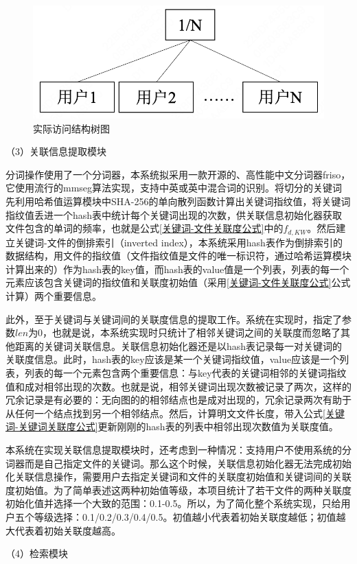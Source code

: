 \documentclass[promaster]{thesis-uestc}
\begin{document}
\begin{figure}[htbp]
    \centering
    \includegraphics[width = 0.5\linewidth]{pic/访问结构树.png}
    \caption{实际访问结构树图}
    \label{实际访问结构树图}
\end{figure}

（3）关联信息提取模块

分词操作使用了一个分词器，本系统拟采用一款开源的、高性能中文分词器friso，它使用流行的mmseg算法实现，支持中英或英中混合词的识别。将切分的关键词先利用哈希值运算模块中SHA-256的单向散列函数计算出关键词指纹值，将关键词指纹值丢进一个hash表中统计每个关键词出现的次数，供关联信息初始化器获取文件包含的单词的频率，也就是公式\ref{关键词-文件关联度公式}中的$f_{d, KW}$。然后建立关键词-文件的倒排索引（inverted index），本系统采用hash表作为倒排索引的数据结构，用文件的指纹值（文件指纹值是文件的唯一标识符，通过哈希运算模块计算出来的）作为hash表的key值，而hash表的value值是一个列表，列表的每一个元素应该包含关键词的指纹值和关联度初始值（采用\ref{关键词-文件关联度公式}公式计算）两个重要信息。

此外，至于关键词与关键词间的关联度信息的提取工作。系统在实现时，指定了参数$len$为0，也就是说，本系统实现时只统计了相邻关键词之间的关联度而忽略了其他距离的关键词关联信息。关联信息初始化器还是以hash表记录每一对关键词的关联度信息。此时，hash表的key应该是某一个关键词指纹值，value应该是一个列表，列表的每一个元素包含两个重要信息：与key代表的关键词相邻的关键词指纹值和成对相邻出现的次数。也就是说，相邻关键词出现次数被记录了两次，这样的冗余记录是有必要的：无向图的的相邻结点也是成对出现的，冗余记录两次有助于从任何一个结点找到另一个相邻结点。然后，计算明文文件长度，带入公式\ref{关键词-关键词关联度公式}更新刚刚的hash表的列表中相邻出现次数值为关联度值。

本系统在实现关联信息提取模块时，还考虑到一种情况：支持用户不使用系统的分词器而是自己指定文件的关键词。那么这个时候，关联信息初始化器无法完成初始化关联信息操作，需要用户去指定关键词和文件的关联度初始值和关键词间的关联度初始值。为了简单表述这两种初始值等级，本项目统计了若干文件的两种关联度初始化值并选择一个大致的范围：0.1-0.5。所以，为了简化整个系统实现，只给用户五个等级选择：0.1/0.2/0.3/0.4/0.5。初值越小代表着初始关联度越低；初值越大代表着初始关联度越高。


（4）检索模块
\end{document}
